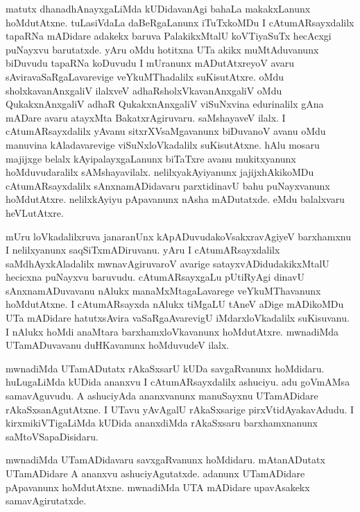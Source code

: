 \documentclass{article}
\begin{document}
\begin{mn}%
matutx dhanadhAnayxgaLiMda kUDidavanAgi bahaLa makakxLanunx hoMdutAtxne. tuLasiVdaLa daBeRgaLanunx 
iTuTxkoMDu I cAtumARsayxdalilx tapaRNa mADidare adakekx baruva PalakikxMtalU koVTiyaSuTx hecAcxgi 
puNayxvu barutatxde. yAru oMdu hotitxna UTa akikx muMtAduvanunx biDuvudu tapaRNa koDuvudu I mUranunx 
mADutAtxreyoV avaru sAviravaSaRgaLavarevige veYkuMThadalilx suKisutAtxre. oMdu sholxkavanAnxgaliV 
ilalxveV adhaRsholxVkavanAnxgaliV oMdu QukakxnAnxgaliV adhaR QukakxnAnxgaliV viSuNxvina edurinalilx 
gAna mADare avaru atayxMta BakatxrAgiruvaru. saMshayaveV ilalx. I cAtumARsayxdalilx yAvanu 
sitxrXVsaMgavanunx biDuvanoV avanu oMdu manuvina kAladavarevige viSuNxloVkadalilx suKisutAtxne. 
hAlu mosaru majijxge belalx kAyipalayxgaLanunx biTaTxre avanu mukitxyanunx hoMduvudaralilx 
sAMshayavilalx. nelilxyakAyiyanunx jajijxhAkikoMDu cAtumARsayxdalilx sAnxnamADidavaru parxtidinavU 
bahu puNayxvanunx hoMdutAtxre. nelilxkAyiyu pApavanunx nAsha mADutatxde. eMdu balalxvaru heVLutAtxre.
\end{mn}

\begin{mn}%
mUru loVkadalilxruva janaranUnx kApADuvudakoVsakxravAgiyeV barxhamxnu I nelilxyanunx 
saqSiTxmADiruvanu. yAru I cAtumARsayxdalilx saMdhAyxkAladalilx mwnavAgiruvaroV avarige 
satayxvADidudakikxMtalU hecicxna puNayxvu baruvudu. cAtumARsayxgaLu pUtiRyAgi dinavU 
sAnxnamADuvavanu nAlukx manaMxMtagaLavarege veYkuMThavanunx hoMdutAtxne. I cAtumARsayxda nAlukx 
tiMgaLU tAneV aDige mADikoMDu UTa mADidare hatutxsAvira vaSaRgaAvarevigU iMdarxloVkadalilx 
suKisuvanu. I nAlukx hoMdi anaMtara barxhamxloVkavanunx hoMdutAtxre. mwnadiMda UTamADuvavanu 
duHKavanunx hoMduvudeV ilalx.
\end{mn}

\begin{mn}%
mwnadiMda UTamADutatx rAkaSxsarU kUDa savgaRvanunx hoMdidaru. huLugaLiMda kUDida ananxvu I 
cAtumARsayxdalilx ashuciyu. adu goVmAMsa samavAguvudu. A ashuciyAda ananxvanunx manuSayxnu 
UTamADidare rAkaSxsanAgutAtxne. I UTavu yAvAgalU rAkaSxsarige pirxVtidAyakavAdudu. I 
kirxmikiVTigaLiMda kUDida ananxdiMda rAkaSxsaru barxhamxnanunx saMtoVSapaDisidaru.
\end{mn}

\begin{mn}%
mwnadiMda UTamADidavaru savxgaRvanunx hoMdidaru. mAtanADutatx UTamADidare A ananxvu 
ashuciyAgutatxde. adanunx UTamADidare pApavanunx hoMdutAtxne. mwnadiMda UTA mADidare upavAsakekx 
samavAgirutatxde.
\end{mn}
\end{document}
